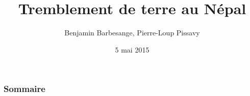 \documentclass[xcolor=dvipsnames]{beamer}
\title{Tremblement de terre au Népal}
\author[Benjamin B., Pierre-Loup P.]{Benjamin Barbesange, Pierre-Loup Pissavy}
\institute[]{ISIMA -- ZZ1 -- Communication}
\date{5 mai 2015}
\begin{document}
	\begin{frame}[plain] %
		\titlepage
	\end{frame}
	\begin{frame} %
		\frametitle{Sommaire}
		\tableofcontents[]
	\end{frame}
  
  
  
  
\end{document}
